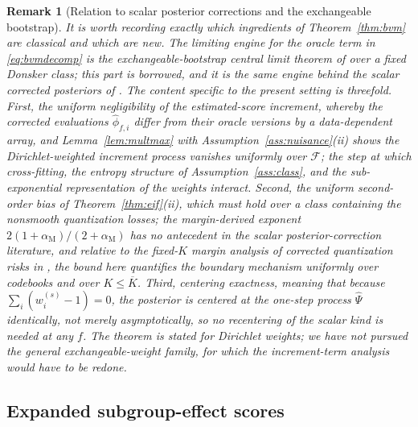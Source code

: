 \documentclass[11pt]{article}
\newtheorem{remark}{Remark}
\newcommand{\calF}{\mathcal F}
\newcommand{\hPsi}{\widehat\Psi}
\newcommand{\hphi}{\widehat\phi}
\newcommand{\am}{\alpha_{\mathrm M}}
\begin{document}
\begin{remark}[Relation to scalar posterior corrections and the exchangeable bootstrap]\label{rem:bvmcredit}
It is worth recording exactly which ingredients of Theorem~\ref{thm:bvm} are classical and which are new. The limiting engine for the oracle term in \eqref{eq:bvmdecomp} is the exchangeable-bootstrap central limit theorem of \cite{praestgaard1993} over a fixed Donsker class; this part is borrowed, and it is the same engine behind the scalar corrected posteriors of \cite{yiu2025}. The content specific to the present setting is threefold. First, the uniform negligibility of the estimated-score increment, whereby the corrected evaluations $\hphi_{f,i}$ differ from their oracle versions by a data-dependent array, and Lemma~\ref{lem:multmax} with Assumption~\ref{ass:nuisance}(ii) shows the Dirichlet-weighted increment process vanishes uniformly over $\calF$; the step at which cross-fitting, the entropy structure of Assumption~\ref{ass:class}, and the sub-exponential representation of the weights interact. Second, the uniform second-order bias of Theorem~\ref{thm:eif}(ii), which must hold over a class containing the nonsmooth quantization losses; the margin-derived exponent $2(1+\am)/(2+\am)$ has no antecedent in the scalar posterior-correction literature, and relative to the fixed-$K$ margin analysis of corrected quantization risks in \cite{kim2026causal}, the bound here quantifies the boundary mechanism uniformly over codebooks and over $K\le\overline K$. Third, centering exactness, meaning that because $\sum_i(w^{(s)}_i-1)=0$, the posterior is centered at the one-step process $\hPsi$ identically, not merely asymptotically, so no recentering of the scalar kind is needed at any $f$. The theorem is stated for Dirichlet weights; we have not pursued the general exchangeable-weight family, for which the increment-term analysis would have to be redone.
\end{remark}

\subsection{Expanded subgroup-effect scores}\label{sec:app:expanded_effect_scores}
\end{document}
